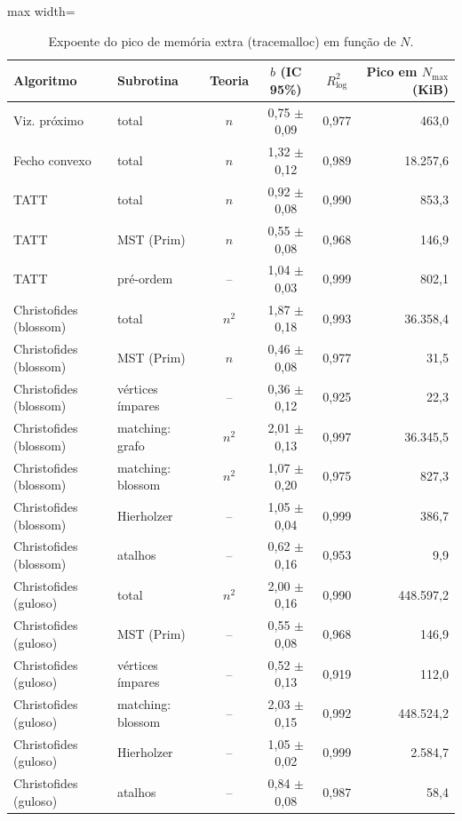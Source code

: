 \begin{table}[htb]
\centering
\caption{Expoente do pico de memória extra (tracemalloc) em função de $N$.}
\label{tab:memoria}
\small
\begin{adjustbox}{max width=\linewidth}
\begin{tabular}{llcccr}
\toprule
Algoritmo & Subrotina & Teoria & $b$ (IC 95\%) & $R^2_{\log}$ & Pico em $N_{\max}$ (KiB) \\
\midrule
Viz. próximo & total & $n$ & 0{,}75 $\pm$ 0{,}09 & 0{,}977 & 463{,}0 \\
Fecho convexo & total & $n$ & 1{,}32 $\pm$ 0{,}12 & 0{,}989 & 18.257{,}6 \\
TATT & total & $n$ & 0{,}92 $\pm$ 0{,}08 & 0{,}990 & 853{,}3 \\
TATT & MST (Prim) & $n$ & 0{,}55 $\pm$ 0{,}08 & 0{,}968 & 146{,}9 \\
TATT & pré-ordem & -- & 1{,}04 $\pm$ 0{,}03 & 0{,}999 & 802{,}1 \\
Christofides (blossom) & total & $n^2$ & 1{,}87 $\pm$ 0{,}18 & 0{,}993 & 36.358{,}4 \\
Christofides (blossom) & MST (Prim) & $n$ & 0{,}46 $\pm$ 0{,}08 & 0{,}977 & 31{,}5 \\
Christofides (blossom) & vértices ímpares & -- & 0{,}36 $\pm$ 0{,}12 & 0{,}925 & 22{,}3 \\
Christofides (blossom) & matching: grafo & $n^2$ & 2{,}01 $\pm$ 0{,}13 & 0{,}997 & 36.345{,}5 \\
Christofides (blossom) & matching: blossom & $n^2$ & 1{,}07 $\pm$ 0{,}20 & 0{,}975 & 827{,}3 \\
Christofides (blossom) & Hierholzer & -- & 1{,}05 $\pm$ 0{,}04 & 0{,}999 & 386{,}7 \\
Christofides (blossom) & atalhos & -- & 0{,}62 $\pm$ 0{,}16 & 0{,}953 & 9{,}9 \\
Christofides (guloso) & total & $n^2$ & 2{,}00 $\pm$ 0{,}16 & 0{,}990 & 448.597{,}2 \\
Christofides (guloso) & MST (Prim) & -- & 0{,}55 $\pm$ 0{,}08 & 0{,}968 & 146{,}9 \\
Christofides (guloso) & vértices ímpares & -- & 0{,}52 $\pm$ 0{,}13 & 0{,}919 & 112{,}0 \\
Christofides (guloso) & matching: blossom & -- & 2{,}03 $\pm$ 0{,}15 & 0{,}992 & 448.524{,}2 \\
Christofides (guloso) & Hierholzer & -- & 1{,}05 $\pm$ 0{,}02 & 0{,}999 & 2.584{,}7 \\
Christofides (guloso) & atalhos & -- & 0{,}84 $\pm$ 0{,}08 & 0{,}987 & 58{,}4 \\
\bottomrule
\end{tabular}
\end{adjustbox}
\end{table}
